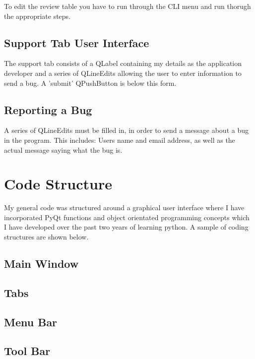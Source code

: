 To edit the review table you have to run through the CLI menu and run thorugh the appropriate steps.



\subsection{Support Tab User Interface}

The support tab consists of a QLabel containing my details as the application developer and a series of QLineEdits allowing the user to enter information to send a bug. A 'submit' QPushButton is below this form.

\subsection{Reporting a Bug}

A series of QLineEdits must be filled in, in order to send a message about a bug in the program. This includes: Users name and email address, as well as the actual message saying what the bug is. 










\section{Code Structure}

My general code was structured around a graphical user interface where I have incorporated PyQt functions and object orientated programming concepts which I have developed over the past two years of learning python. A sample of coding structures are shown below.


\subsection{Main Window}

\subsection{Tabs}

\subsection{Menu Bar}

\subsection{Tool Bar}

